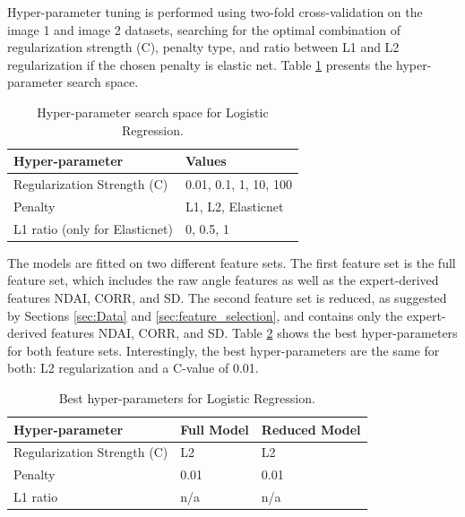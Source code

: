 \documentclass[11pt,letterpaper]{article}
\begin{document}
Hyper-parameter tuning is performed using two-fold cross-validation on the image 1 and image 2 datasets, searching for the optimal combination of regularization strength (C), penalty type, and ratio between L1 and L2 regularization if the chosen penalty is elastic net.
Table \ref{table:log_reg_hp_space} presents the hyper-parameter search space.

\begin{table}[]
\centering
\begin{tabular}{|l|l|}
\hline
\textbf{Hyper-parameter} & \textbf{Values} \\ \hline
Regularization Strength (C)                    & 0.01, 0.1, 1, 10, 100       \\
Penalty           & L1, L2, Elasticnet         \\
L1 ratio (only for Elasticnet)        & 0, 0.5, 1     \\ \hline
\end{tabular}
\caption{Hyper-parameter search space for Logistic Regression.}
\label{table:log_reg_hp_space}
\end{table}

The models are fitted on two different feature sets. The first feature set is the full feature set, which includes the raw angle features as well as the expert-derived features NDAI, CORR, and SD. The second feature set is reduced, as suggested by Sections \ref{sec:Data} and \ref{sec:feature_selection}, and contains only the expert-derived features NDAI, CORR, and SD. Table \ref{table:log_reg_best_hp} shows the best hyper-parameters for both feature sets. Interestingly, the best hyper-parameters are the same for both: L2 regularization and a C-value of 0.01.

\begin{table}[]
\centering
\begin{tabular}{|l|l|l|}
\hline
\textbf{Hyper-parameter}     & \textbf{Full Model} & \textbf{Reduced Model} \\ \hline
Regularization Strength (C) & L2                  & L2                     \\
Penalty                     & 0.01                & 0.01                   \\
L1 ratio                    & n/a                 & n/a                    \\ \hline
\end{tabular}
\caption{Best hyper-parameters for Logistic Regression.}
\label{table:log_reg_best_hp}
\end{table}
\end{document}
